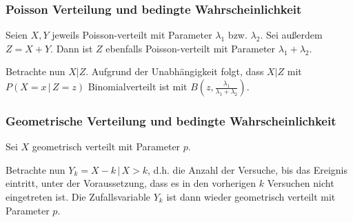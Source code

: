 			\subsubsection{Poisson Verteilung und bedingte Wahrscheinlichkeit}
				Seien \(X, Y\) jeweils Poisson-verteilt mit Parameter \( \lambda_1 \) bzw. \( \lambda_2 \). Sei außerdem \( Z = X + Y \). Dann ist \(Z\) ebenfalls Poisson-verteilt mit Parameter \( \lambda_1 + \lambda_2 \).

				Betrachte nun \( X \vert Z \).  Aufgrund der Unabhängigkeit folgt, dass \( X \vert Z \) mit \( P(X = x \,\vert\, Z = z) \) Binomialverteilt ist mit \( B(z, \frac{\lambda_1}{\lambda_1 + \lambda_2}) \).

			\subsubsection{Geometrische Verteilung und bedingte Wahrscheinlichkeit}
				Sei \( X \) geometrisch verteilt mit Parameter \(p\).

				Betrachte nun \( Y_k = X - k \,\vert\, X > k \), d.h. die Anzahl der Versuche, bis das Ereignis eintritt, unter der Voraussetzung, dass es in den vorherigen \(k\) Versuchen nicht eingetreten ist. Die Zufallsvariable \(Y_k\) ist dann wieder geometrisch verteilt mit Parameter \(p\).
